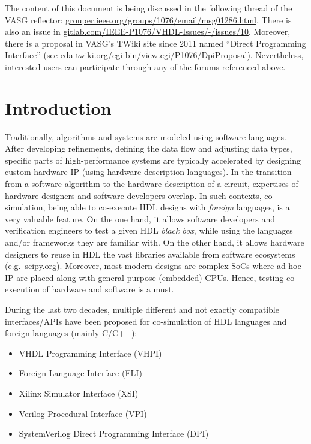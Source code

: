 \documentclass[
]{article}
\providecommand{\tightlist}{%
  \setlength{\itemsep}{0pt}\setlength{\parskip}{0pt}}
\begin{document}
The content of this document is being discussed in the following thread of the VASG reflector: \href{https://grouper.ieee.org/groups/1076/email/msg01286.html}{grouper.ieee.org/groups/1076/email/msg01286.html}. There is also an issue in \href{https://gitlab.com/IEEE-P1076/VHDL-Issues/-/issues/10}{gitlab.com/IEEE-P1076/VHDL-Issues/-/issues/10}. Moreover, there is a proposal in VASG's TWiki site since 2011 named ``Direct Programming Interface'' (see \href{http://www.eda-twiki.org/cgi-bin/view.cgi/P1076/DpiProposal}{eda-twiki.org/cgi-bin/view.cgi/P1076/DpiProposal}). Nevertheless, interested users can participate through any of the forums referenced above.

\hypertarget{intro}{%
\section{Introduction}\label{intro}}

Traditionally, algorithms and systems are modeled using software languages. After developing refinements, defining the data flow and adjusting data types, specific parts of high-performance systems are typically accelerated by designing custom hardware IP (using hardware description languages). In the transition from a software algorithm to the hardware description of a circuit, expertises of hardware designers and software developers overlap. In such contexts, co-simulation, being able to co-execute HDL designs with \emph{foreign} languages, is a very valuable feature. On the one hand, it allows software developers and verification engineers to test a given HDL \emph{black box}, while using the languages and/or frameworks they are familiar with. On the other hand, it allows hardware designers to reuse in HDL the vast libraries available from software ecosystems (e.g.~\href{https://www.scipy.org/}{scipy.org}). Moreover, most modern designs are complex SoCs where ad-hoc IP are placed along with general purpose (embedded) CPUs. Hence, testing co-execution of hardware and software is a must.

During the last two decades, multiple different and not exactly compatible interfaces/APIs have been proposed for co-simulation of HDL languages and foreign languages (mainly C/C++):

\begin{itemize}
\tightlist
\item
  VHDL Programming Interface (VHPI)
\item
  Foreign Language Interface (FLI)
\item
  Xilinx Simulator Interface (XSI)
\item
  Verilog Procedural Interface (VPI)
\item
  SystemVerilog Direct Programming Interface (DPI)
\end{itemize}
\end{document}
